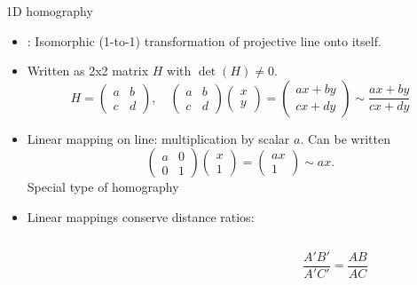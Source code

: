 \documentclass[9pt]{beamer}
\newcommand{\myemph}[1]{{\color{blue}{#1}}}
\begin{document}
\begin{frame}[t]{1D homography}
  \begin{itemize}
  \item \myemph{Homography}: Isomorphic (1-to-1) transformation of projective line onto itself. 
  \item Written as 2x2 matrix $H$ with $\det(H)\not=0$.   
    $$
    H =
    \begin{pmatrix}
      a & b\\ c & d
    \end{pmatrix},\quad 
    \begin{pmatrix}
      a & b\\ c & d
    \end{pmatrix}
    \begin{pmatrix}
      x\\y
    \end{pmatrix}
    =
    \begin{pmatrix}
      ax + by\\cx + dy
    \end{pmatrix}\sim
    \frac{ax + by }{cx + dy}
    $$
  \item Linear mapping on line: multiplication by scalar $a$. Can be written
    $$
    \begin{pmatrix}
      a & 0\\ 0 &1
    \end{pmatrix}
    \begin{pmatrix}
      x \\ 1
    \end{pmatrix}
    =
    \begin{pmatrix}
      ax \\ 1
    \end{pmatrix}\sim ax.
    $$
    Special type of homography
  \item Linear mappings conserve distance ratios:
    \begin{columns}
      \begin{column}{0.6\textwidth}
      \end{column}
      \begin{column}{0.4\textwidth}
        $$
        \frac{A'B'}{A'C'} = \frac{AB}{AC}
        $$
      \end{column}
    \end{columns}
  \end{itemize}
\end{frame}
\end{document}
